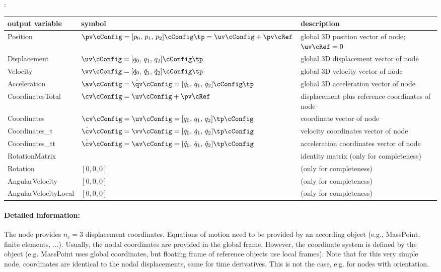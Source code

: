 :
\begin{center}
\footnotesize
\begin{longtable}{| p{5cm} | p{5cm} | p{6cm} |} 
\hline
\bf output variable & \bf symbol & \bf description \\ \hline
Position & $\pv\cConfig = [p_0,\,p_1,\,p_2]\cConfig\tp= \uv\cConfig + \pv\cRef$ & global 3D position vector of node; $\uv\cRef=0$\\ \hline
Displacement & $\uv\cConfig = [q_0,\,q_1,\,q_2]\cConfig\tp$ & global 3D displacement vector of node\\ \hline
Velocity & $\vv\cConfig = [\dot q_0,\,\dot q_1,\,\dot q_2]\cConfig\tp$ & global 3D velocity vector of node\\ \hline
Acceleration & $\av\cConfig = \ddot \qv\cConfig = [\ddot q_0,\,\ddot q_1,\,\ddot q_2]\cConfig\tp$ & global 3D acceleration vector of node\\ \hline
CoordinatesTotal & $\cv\cConfig = \uv\cConfig + \pv\cRef$ &  displacement plus reference coordinates of node\\ \hline
Coordinates & $\cv\cConfig = \uv\cConfig = [q_0,\,q_1,\,q_2]\tp\cConfig$ &  coordinate vector of node\\ \hline
Coordinates\_t & $\dot\cv\cConfig = \vv\cConfig = [\dot q_0,\,\dot q_1,\,\dot q_2]\tp\cConfig$ &  velocity coordinates vector of node\\ \hline
Coordinates\_tt & $\ddot\cv\cConfig = \av\cConfig = [\ddot q_0,\,\ddot q_1,\,\ddot q_2]\tp\cConfig$ &  acceleration coordinates vector of node\\ \hline
RotationMatrix &  & identity matrix (only for completeness)\\ \hline
Rotation & $[0,0,0]$ &  (only for completeness)\\ \hline
AngularVelocity & $[0,0,0]$ &  (only for completeness)\\ \hline
AngularVelocityLocal & $[0,0,0]$ &  (only for completeness)\\ \hline
\end{longtable}
\end{center}
 \noindent
    \paragraph{Detailed information:}
    The node provides $n_c=3$ displacement coordinates. Equations of motion need to be provided by an according object (e.g., MassPoint, finite elements, ...).
    Usually, the nodal coordinates are provided in the global frame. However, the coordinate system is defined by the object (e.g. MassPoint uses global coordinates, but floating frame of reference objects use local frames).
    Note that for this very simple node, coordinates are identical to the nodal displacements, same for time derivatives. This is not the case, e.g. for nodes with orientation. \vspace{6pt}\\

